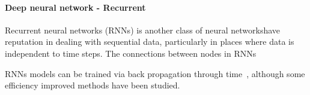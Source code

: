 \paragraph{Deep neural network - Recurrent}
Recurrent neural networks (RNNs) is another class of neural networkshave reputation in dealing with sequential data, particularly in places where data is independent to time steps. The connections between nodes in RNNs 


RNNs models can be trained via back propagation through time~\cite{Goodfellow-et-al-2016}, although some efficiency improved methods have been studied.~\cite{963769,neco.1989,Gomez:2008:ANE:1390681.1390712}